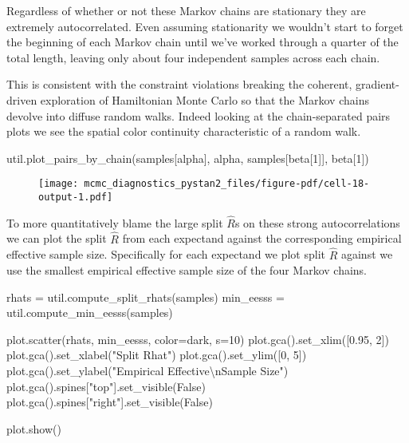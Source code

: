 \documentclass[
  letterpaper,
  DIV=11,
  numbers=noendperiod]{scrartcl}
\newenvironment{Shaded}{\begin{snugshade}}{\end{snugshade}}
\newcommand{\CharTok}[1]{\textcolor[rgb]{0.13,0.47,0.30}{#1}}
\newcommand{\DecValTok}[1]{\textcolor[rgb]{0.68,0.00,0.00}{#1}}
\newcommand{\FloatTok}[1]{\textcolor[rgb]{0.68,0.00,0.00}{#1}}
\newcommand{\NormalTok}[1]{\textcolor[rgb]{0.00,0.23,0.31}{#1}}
\newcommand{\OperatorTok}[1]{\textcolor[rgb]{0.37,0.37,0.37}{#1}}
\newcommand{\StringTok}[1]{\textcolor[rgb]{0.13,0.47,0.30}{#1}}
\newcommand{\VariableTok}[1]{\textcolor[rgb]{0.07,0.07,0.07}{#1}}
\begin{document}
Regardless of whether or not these Markov chains are stationary they are
extremely autocorrelated. Even assuming stationarity we wouldn't start
to forget the beginning of each Markov chain until we've worked through
a quarter of the total length, leaving only about four independent
samples across each chain.

This is consistent with the constraint violations breaking the coherent,
gradient-driven exploration of Hamiltonian Monte Carlo so that the
Markov chains devolve into diffuse random walks. Indeed looking at the
chain-separated pairs plots we see the spatial color continuity
characteristic of a random walk.

\begin{Shaded}
\begin{Highlighting}[]
\NormalTok{util.plot\_pairs\_by\_chain(samples[}\StringTok{\textquotesingle{}alpha\textquotesingle{}}\NormalTok{], }\StringTok{\textquotesingle{}alpha\textquotesingle{}}\NormalTok{, }
\NormalTok{                         samples[}\StringTok{\textquotesingle{}beta[1]\textquotesingle{}}\NormalTok{], }\StringTok{\textquotesingle{}beta[1]\textquotesingle{}}\NormalTok{)}
\end{Highlighting}
\end{Shaded}

\begin{figure}[H]

{\centering \texttt{[image: mcmc\_diagnostics\_pystan2\_files/figure-pdf/cell-18-output-1.pdf]}

}

\end{figure}

To more quantitatively blame the large split \(\hat{R}\)s on these
strong autocorrelations we can plot the split \(\hat{R}\) from each
expectand against the corresponding empirical effective sample size.
Specifically for each expectand we plot split \(\hat{R}\) against we use
the smallest empirical effective sample size of the four Markov chains.

\begin{Shaded}
\begin{Highlighting}[]
\NormalTok{rhats }\OperatorTok{=}\NormalTok{ util.compute\_split\_rhats(samples)}
\NormalTok{min\_eesss }\OperatorTok{=}\NormalTok{ util.compute\_min\_eesss(samples)}

\NormalTok{plot.scatter(rhats, min\_eesss, color}\OperatorTok{=}\NormalTok{dark, s}\OperatorTok{=}\DecValTok{10}\NormalTok{)}
\NormalTok{plot.gca().set\_xlim([}\FloatTok{0.95}\NormalTok{, }\DecValTok{2}\NormalTok{])}
\NormalTok{plot.gca().set\_xlabel(}\StringTok{"Split Rhat"}\NormalTok{)}
\NormalTok{plot.gca().set\_ylim([}\DecValTok{0}\NormalTok{, }\DecValTok{5}\NormalTok{])}
\NormalTok{plot.gca().set\_ylabel(}\StringTok{"Empirical Effective}\CharTok{\textbackslash{}n}\StringTok{Sample Size"}\NormalTok{)}
\NormalTok{plot.gca().spines[}\StringTok{"top"}\NormalTok{].set\_visible(}\VariableTok{False}\NormalTok{)}
\NormalTok{plot.gca().spines[}\StringTok{"right"}\NormalTok{].set\_visible(}\VariableTok{False}\NormalTok{)}

\NormalTok{plot.show()}
\end{Highlighting}
\end{Shaded}
\end{document}
